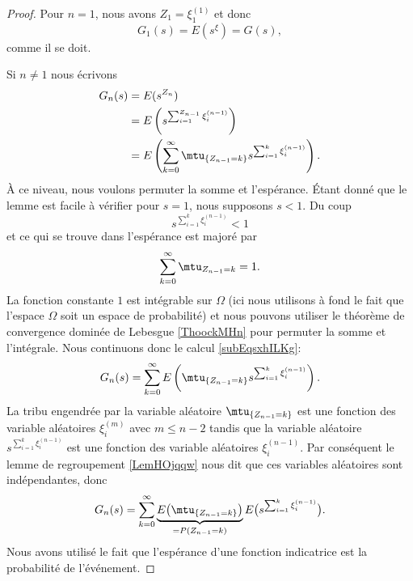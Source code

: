 \begin{proof}
    Pour \( n=1\), nous avons \( Z_1=\xi^{(1)}_1\) et donc
    \begin{equation}
        G_1(s)=E(s^{\xi})=G(s),
    \end{equation}
    comme il se doit.

    Si \( n\neq 1\) nous écrivons
    \begin{subequations}    \label{subEqsxhILKg}
        \begin{align}
            G_n(s)&=E(s^{Z_n})\\
            &=E\left( s^{\sum_{i=1}^{Z_{n-1}}\xi_i^{(n-1)}} \right)\\
            &=E\left( \sum_{k=0}^{\infty}\mtu_{\{ Z_{n-1}=k \}}s^{\sum_{i=1}^k\xi_i^{(n-1)}} \right).
        \end{align}
    \end{subequations}
    À ce niveau, nous voulons permuter la somme et l'espérance. Étant donné que le lemme est facile à vérifier pour \( s=1\), nous supposons \( s<1\). Du coup 
    \begin{equation}
        s^{\sum_{i=1}^k\xi_i^{(n-1)}}<1
    \end{equation}
    et ce qui se trouve dans l'espérance est majoré par
    \begin{equation}
        \sum_{k=0}^{\infty}\mtu_{Z_{n-1}=k}=1.
    \end{equation}
    La fonction constante \( 1\) est intégrable sur \( \Omega\) (ici nous utilisons à fond le fait que l'espace \( \Omega\) soit un espace de probabilité) et nous pouvons utiliser le théorème de convergence dominée de Lebesgue \ref{ThoockMHn} pour permuter la somme et l'intégrale. Nous continuons donc le calcul \eqref{subEqsxhILKg}:
    \begin{equation}
        G_n(s)=\sum_{k=0}^{\infty}E\left(  \mtu_{\{ Z_{n-1}=k \}}s^{\sum_{i=1}^k\xi_i^{(n-1)}}  \right).
    \end{equation}
    La tribu engendrée par la variable aléatoire \( \mtu_{\{ Z_{n-1}=k \}}\) est une fonction des variable aléatoires \( \xi_i^{(m)}\) avec \( m\leq n-2\) tandis que la variable aléatoire \( s^{\sum_{i=1}^k\xi_i^{(n-1)}}\) est une fonction des variable aléatoires \( \xi_{i}^{(n-1)}\). Par conséquent le lemme de regroupement \ref{LemHOjqqw} nous dit que ces variables aléatoires sont indépendantes, donc
    \begin{equation}
        G_n(s)=\sum_{k=0}^{\infty}\underbrace{E\big( \mtu_{\{ Z_{n-1}=k \}} \big)}_{=P(Z_{n-1}=k)}E\big( s^{\sum_{i=1}^{k}\xi_i^{(n-1)}} \big).
    \end{equation}
    Nous avons utilisé le fait que l'espérance d'une fonction indicatrice est la probabilité de l'événement.


\end{proof}

